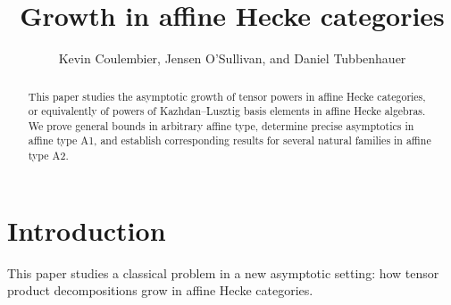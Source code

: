\documentclass[a4paper,11pt]{amsart}
\numberwithin{equation}{subsection}
\theoremstyle{definition}
\theoremstyle{remark}
\begin{document}
\title[Growth in affine Hecke categories]{Growth in affine Hecke categories}
\author[K. Coulembier, J. O'Sullivan, and D. Tubbenhauer]{Kevin Coulembier, Jensen O'Sullivan, and Daniel Tubbenhauer}

\address{K.C.: The University of Sydney, School of Mathematics and Statistics F07, Office Carslaw 717, NSW 2006, Australia, \href{https://www.maths.usyd.edu.au/u/kevinc/}{www.maths.usyd.edu.au/u/kevinc}, \href{https://orcid.org/0000-0003-0996-3965}{ORCID 0000-0003-0996-3965}}

\address{J.O.: The University of Sydney, School of Mathematics and Statistics F07, NSW 2006, Australia}

\address{D.T.: The University of Sydney, School of Mathematics and Statistics F07, Office Carslaw 827, NSW 2006, Australia, \href{http://www.dtubbenhauer.com}{www.dtubbenhauer.com}, \href{https://orcid.org/0000-0001-7265-5047}{ORCID 0000-0001-7265-5047}}

\begin{abstract}
This paper studies the asymptotic growth of tensor powers in affine Hecke categories, or equivalently of powers of Kazhdan--Lusztig basis elements in affine Hecke algebras. We prove general bounds in arbitrary affine type, determine precise asymptotics in affine type A1, and establish corresponding results for several natural families in affine type A2.
\end{abstract}




\maketitle

\tableofcontents

\section{Introduction}\label{sec:intro}

This paper studies a classical problem in a new asymptotic
setting: how tensor product decompositions grow in affine Hecke categories.
\end{document}
